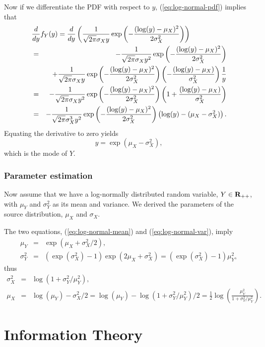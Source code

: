 \documentclass[10pt, twoside]{book}   	%
\begin{document}
Now if we differentiate the PDF with respect to $y$,
(\ref{eq:log-normal-pdf}) implies that
\begin{eqnarray*}
\lefteqn{
\frac{d}{dy} f_Y(y)
= \frac{d}{dy} \left(\frac{1}{\sqrt{2\pi} \sigma_X y}  \exp\left(-\frac{(\log(y)-\mu_X)^2}{2\sigma_X^2}\right)\right)
}
\\
&=&
-\frac{1}{\sqrt{2\pi} \sigma_X y^2}  \exp\left(-\frac{(\log(y)-\mu_X)^2}{2\sigma_X^2}\right)
\\
&&
+
\frac{1}{\sqrt{2\pi} \sigma_X y}  \exp\left(-\frac{(\log(y)-\mu_X)^2}{2\sigma_X^2}\right)
\left(-\frac{(\log(y)-\mu_X)}{\sigma_X^2}\right)
\frac{1}{y}
\\
&=&
-\frac{1}{\sqrt{2\pi} \sigma_X y^2}  \exp\left(-\frac{(\log(y)-\mu_X)^2}{2\sigma_X^2}\right)
\left(1+\frac{(\log(y)-\mu_X)}{\sigma_X^2} \right)
\\
&=&
-\frac{1}{\sqrt{2\pi} \sigma_X^3 y^2}  \exp\left(-\frac{(\log(y)-\mu_X)^2}{2\sigma_X^2}\right)
\left(\log(y)-(\mu_X-\sigma_X^2) \right).
\end{eqnarray*}
Equating the derivative to zero yields
\begin{equation}
y = \exp(\mu_X-\sigma_X^2),
\end{equation}
which is the mode of $Y$.


\subsection{Parameter estimation}

Now assume that we have a log-normally distributed random variable, $Y\in{{\mbox{\bf R}}_{++}}$,
with $\mu_Y$ and $\sigma_Y^2$ as its mean and variance.
We derived the parameters of the source distribution, $\mu_X$ and $\sigma_X$.

The two equations, (\ref{eq:log-normal-mean}) and (\ref{eq:log-normal-var}), imply
\begin{eqnarray*}
\mu_Y &=& \exp(\mu_X+\sigma_X^2/2),
\\
\sigma_Y^2 &=& (\exp(\sigma_X^2)-1)\exp(2\mu_X+\sigma_X^2) = (\exp(\sigma_X^2)-1) \mu_Y^2,
\end{eqnarray*}
thus
\begin{eqnarray*}
\sigma_X^2 &=& \log(1+{\sigma_Y^2}/{\mu_Y^2}),
\\
\mu_X &=& \log(\mu_Y) - \sigma_X^2/2 = \log(\mu_Y) - \log(1+{\sigma_Y^2}/{\mu_Y^2})/2
= \frac{1}{2} \log\left(\frac{\mu_Y^2}{1+{\sigma_Y^2}/{\mu_Y^2}}\right).
\end{eqnarray*}


\chapter{Information Theory}
\end{document}
